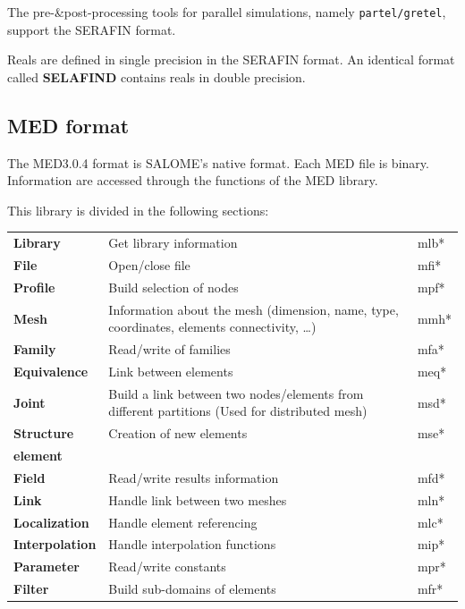 The pre-\&post-processing tools for parallel simulations, namely
\verb+partel/gretel+, support the SERAFIN format.

Reals are defined in single precision in the SERAFIN format. An identical format
called \textbf{SELAFIND} contains reals in double precision.

\subsection{MED format}

The MED3.0.4 format is SALOME's native format. Each MED file is binary.
Information are accessed through the functions of the MED library.

This library is divided in the following sections:

\begin{tabular}{p{70pt}@{ : }p{200pt}p{50pt}}
  \textbf{Library} & Get library information & mlb* \\
  \textbf{File} & Open/close file & mfi* \\
  \textbf{Profile} & Build selection of nodes & mpf*\\
  \textbf{Mesh} & Information about the mesh (dimension, name, type, coordinates, elements connectivity, \ldots) & mmh*\\
  \textbf{Family} & Read/write of families & mfa*\\
  \textbf{Equivalence} & Link between elements & meq*\\
  \textbf{Joint} & Build a link between two nodes/elements from different partitions (Used for distributed mesh)& msd*\\
  \textbf{Structure} & Creation of new elements & mse*\\
  \textbf{element} & & \\
  \textbf{Field} & Read/write results information & mfd*\\
  \textbf{Link} & Handle link between two meshes & mln*\\
  \textbf{Localization} & Handle element referencing & mlc*\\
  \textbf{Interpolation} & Handle interpolation functions & mip*\\
  \textbf{Parameter} & Read/write constants & mpr*\\
  \textbf{Filter} & Build sub-domains of elements & mfr*\\
\end{tabular}

